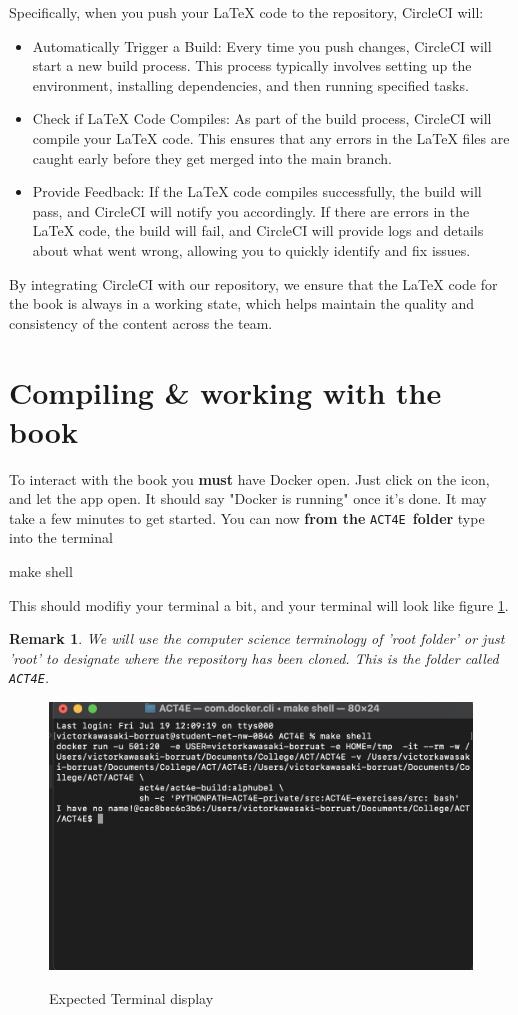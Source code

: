 \documentclass{article}
\newtheorem{remark}{Remark}
\begin{document}
Specifically, when you push your LaTeX code to the repository, CircleCI will:
\begin{itemize}
\item Automatically Trigger a Build: Every time you push changes, CircleCI will start a new build process. This process typically involves setting up the environment, installing dependencies, and then running specified tasks.

\item Check if LaTeX Code Compiles: As part of the build process, CircleCI will compile your LaTeX code. This ensures that any errors in the LaTeX files are caught early before they get merged into the main branch.

\item Provide Feedback: If the LaTeX code compiles successfully, the build will pass, and CircleCI will notify you accordingly. If there are errors in the LaTeX code, the build will fail, and CircleCI will provide logs and details about what went wrong, allowing you to quickly identify and fix issues.
\end{itemize}

By integrating CircleCI with our repository, we ensure that the LaTeX code for the book is always in a working state, which helps maintain the quality and consistency of the content across the team.


\section{Compiling \& working with the book}


To interact with the book you \textbf{must} have Docker open. Just click on the icon, and let the app open. It should say "Docker is running" once it's done. It may take a few minutes to get started. You can now \textbf{from the} \texttt{ACT4E} \textbf{folder} type into the terminal
\begin{bashcode}
    make shell
\end{bashcode}
This should modifiy your terminal a bit, and your terminal will look like figure \ref{fig:enter-label}.
\begin{remark}
    We will use the computer science terminology of 'root folder' or just 'root' to designate where the repository has been cloned. This is the folder called \texttt{ACT4E}.
\end{remark}
\begin{figure}[ht]
    \centering
    \includegraphics[width=0.5\linewidth]{make-shell.png}
    \label{fig:enter-label}
    \caption{Expected Terminal display}
\end{figure}
\end{document}
